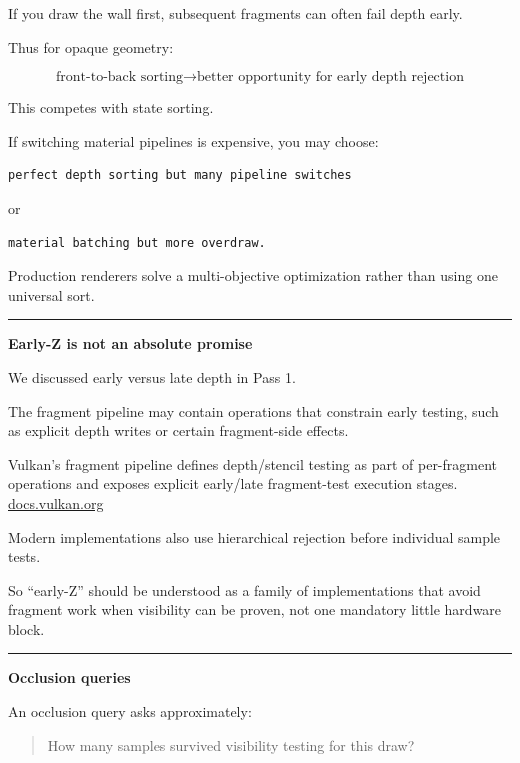 If you draw the wall first, subsequent fragments can often fail depth early.

Thus for opaque geometry:

\[
\boxed{
\text{front-to-back sorting}
\rightarrow
\text{better opportunity for early depth rejection}
}
\]

This competes with state sorting.

If switching material pipelines is expensive, you may choose:

\begin{verbatim}
perfect depth sorting but many pipeline switches
\end{verbatim}

or

\begin{verbatim}
material batching but more overdraw.
\end{verbatim}

Production renderers solve a multi-objective optimization rather than using one universal sort.

\begin{center}\rule{0.5\linewidth}{0.5pt}\end{center}

\textbf{Early-Z is not an absolute promise}

We discussed early versus late depth in Pass 1.

The fragment pipeline may contain operations that constrain early testing, such as explicit depth writes or certain fragment-side effects.

Vulkan's fragment pipeline defines depth/stencil testing as part of per-fragment operations and exposes explicit early/late fragment-test execution stages. \href{https://docs.vulkan.org/spec/latest/chapters/fragops.html?utm_source=chatgpt.com}{docs.vulkan.org}

Modern implementations also use hierarchical rejection before individual sample tests.

So ``early-Z'' should be understood as a family of implementations that avoid fragment work when visibility can be proven, not one mandatory little hardware block.

\begin{center}\rule{0.5\linewidth}{0.5pt}\end{center}

\textbf{Occlusion queries}

An occlusion query asks approximately:

\begin{quote}
How many samples survived visibility testing for this draw?
\end{quote}

